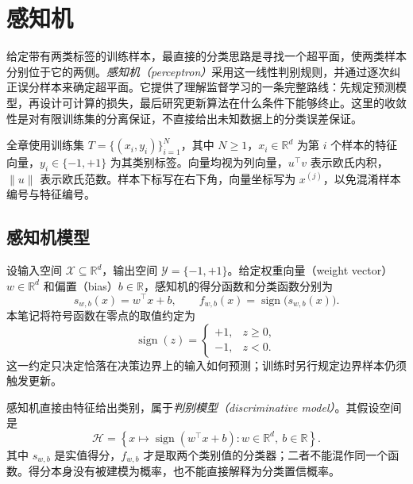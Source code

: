 \setcounter{chapter}{1} %
\chapter{感知机}
\label{chap:lh-perceptron}

给定带有两类标签的训练样本，最直接的分类思路是寻找一个超平面，使两类样本分别位于它的两侧。\emph{感知机（perceptron）}采用这一线性判别规则，并通过逐次纠正误分样本来确定超平面。它提供了理解监督学习的一条完整路线：先规定预测模型，再设计可计算的损失，最后研究更新算法在什么条件下能够终止。这里的收敛性是对有限训练集的分离保证，不直接给出未知数据上的分类误差保证。

全章使用训练集 $T=\{(x_i,y_i)\}_{i=1}^{N}$，其中 $N\geq 1$，$x_i\in\mathbb R^d$ 为第 $i$ 个样本的特征向量，$y_i\in\{-1,+1\}$ 为其类别标签。向量均视为列向量，$u^\top v$ 表示欧氏内积，$\|u\|$ 表示欧氏范数。样本下标写在右下角，向量坐标写为 $x^{(j)}$，以免混淆样本编号与特征编号。

\section{感知机模型}
\label{sec:lh-perceptron-model}

\begin{definition}[感知机模型]
\label{def:lh-perceptron}
设输入空间 $\mathcal X\subseteq\mathbb R^d$，输出空间 $\mathcal Y=\{-1,+1\}$。给定权重向量（weight vector）$w\in\mathbb R^d$ 和偏置（bias）$b\in\mathbb R$，感知机的得分函数和分类函数分别为
\begin{equation}
\label{eq:lh-perceptron-model}
s_{w,b}(x)=w^\top x+b,
\qquad
f_{w,b}(x)=\operatorname{sign}\bigl(s_{w,b}(x)\bigr).
\end{equation}
本笔记将符号函数在零点的取值约定为
\[
\operatorname{sign}(z)=
\begin{cases}
+1,&z\geq 0,\\
-1,&z<0.
\end{cases}
\]
这一约定只决定恰落在决策边界上的输入如何预测；训练时另行规定边界样本仍须触发更新。
\end{definition}

感知机直接由特征给出类别，属于\emph{判别模型（discriminative model）}。其假设空间是
\[
\mathcal H=
\left\{x\longmapsto\operatorname{sign}(w^\top x+b):
w\in\mathbb R^d,\ b\in\mathbb R\right\}.
\]
其中 $s_{w,b}$ 是实值得分，$f_{w,b}$ 才是取两个类别值的分类器；二者不能混作同一个函数。得分本身没有被建模为概率，也不能直接解释为分类置信概率。

